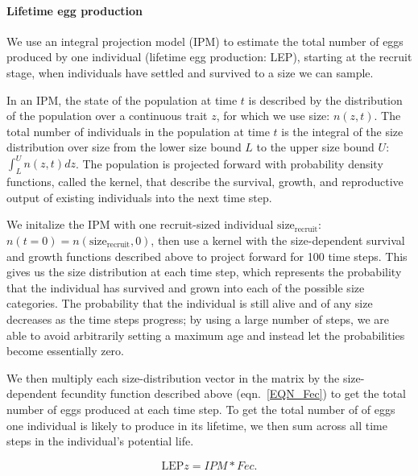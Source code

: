 \documentclass[12pt, oneside]{article}   	%
\begin{document}
\paragraph*{Lifetime egg production}
We use an integral projection model (IPM) \citep[e.g.][]{rees2014building} to estimate the total number of eggs produced by one individual (lifetime egg production: LEP), starting at the recruit stage, when individuals have settled and survived to a size we can sample.

In an IPM, the state of the population at time $t$ is described by the distribution of the population over a continuous trait $z$, for which we use size: $n(z,t)$. The total number of individuals in the population at time $t$ is the integral of the size distribution over size from the lower size bound $L$ to the upper size bound $U$: $\int_L^U n(z,t) dz$. The population is projected forward with probability density functions, called the kernel, that describe the survival, growth, and reproductive output of existing individuals into the next time step. 

We initalize the IPM with one recruit-sized individual $\text{size}_\text{recruit}$: $n(t=0) = n(\text{size}_\text{recruit}, 0)$, then use a kernel with the size-dependent survival and growth functions described above to project forward for 100 time steps. This gives us the size distribution at each time step, which represents the probability that the individual has survived and grown into each of the possible size categories. The probability that the individual is still alive and of any size decreases as the time steps progress; by using a large number of steps, we are able to avoid arbitrarily setting a maximum age and instead let the probabilities become essentially zero. 

We then multiply each size-distribution vector in the matrix by the size-dependent fecundity function described above (eqn.\ \ref{EQN_Fec}) to get the total number of eggs produced at each time step. To get the total number of of eggs one individual is likely to produce in its lifetime, we then sum across all time steps in the individual's potential life.  %

 
\begin{equation} %
\text{LEP}z = IPM * Fec. \label{EQN_LEP}
\end{equation}
\end{document}
